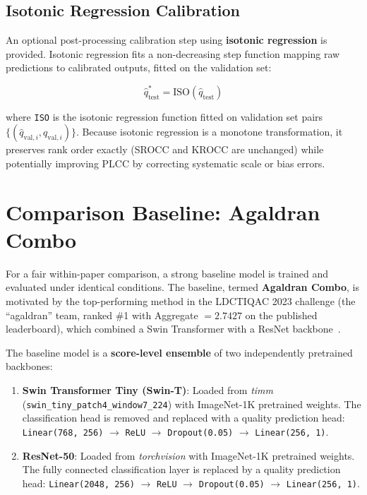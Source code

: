 \subsection{Isotonic Regression Calibration}

An optional post-processing calibration step using \textbf{isotonic regression} is
provided. Isotonic regression fits a non-decreasing step function mapping raw predictions
to calibrated outputs, fitted on the validation set:

\begin{equation}
    \hat{q}^*_{\text{test}} = \text{ISO}(\hat{q}_{\text{test}})
\end{equation}

where \texttt{ISO} is the isotonic regression function fitted on validation set pairs
$\{(\hat{q}_{\text{val},i}, q_{\text{val},i})\}$. Because isotonic regression is a
monotone transformation, it preserves rank order exactly (SROCC and KROCC are unchanged)
while potentially improving PLCC by correcting systematic scale or bias errors.


\section{Comparison Baseline: Agaldran Combo}
\label{sec:baseline}

For a fair within-paper comparison, a strong baseline model is trained and evaluated
under identical conditions. The baseline, termed \textbf{Agaldran Combo}, is motivated
by the top-performing method in the LDCTIQAC 2023 challenge (the ``agaldran'' team,
ranked \#1 with Aggregate $= 2.7427$ on the published leaderboard), which combined a
Swin Transformer with a ResNet backbone~\cite{lee2025ldctiqac}.

The baseline model is a \textbf{score-level ensemble} of two independently pretrained
backbones:

\begin{enumerate}
    \item \textbf{Swin Transformer Tiny (Swin-T)}: Loaded from \textit{timm}
          (\texttt{swin\_tiny\_patch4\_window7\_224}) with ImageNet-1K pretrained
          weights. The classification head is removed and replaced with a quality
          prediction head: \texttt{Linear(768, 256)} $\to$ \texttt{ReLU} $\to$
          \texttt{Dropout(0.05)} $\to$ \texttt{Linear(256, 1)}.
    \item \textbf{ResNet-50}: Loaded from \textit{torchvision} with ImageNet-1K
          pretrained weights. The fully connected classification layer is replaced by a
          quality prediction head: \texttt{Linear(2048, 256)} $\to$ \texttt{ReLU} $\to$
          \texttt{Dropout(0.05)} $\to$ \texttt{Linear(256, 1)}.
\end{enumerate}


